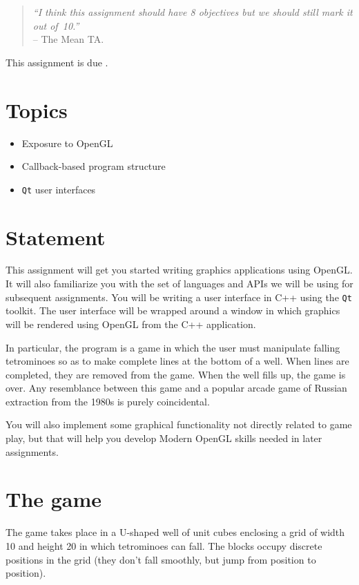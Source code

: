 \begin{quote}
        {\sl
        ``I think this assignment should have 8 objectives but we should still mark it out of~10.''
        } \\
        \mbox{}\hfill -- The Mean TA.
\end{quote}

This assignment is due {\bf \AoneDeadline}.

\section{Topics}

\begin{itemize}
	\item Exposure to OpenGL
	\item Callback-based program structure
	\item \texttt{Qt} user interfaces
\end{itemize}

\section{Statement}

This assignment will get you started writing graphics applications
using OpenGL.  It will also familiarize you with the set of languages
and APIs we will be using for subsequent assignments.  You will be
writing a user interface in C++ using the \texttt{Qt} toolkit.
The user interface will be wrapped around a window in which graphics
will be rendered using OpenGL from the C++ application.

In particular, the program is a game in which the user must manipulate
falling tetrominoes so as to make complete lines at the bottom of a
well.  When lines are completed, they are removed from the game.  When
the well fills up, the game is over.  Any resemblance between this
game and a popular arcade game of Russian extraction from the 1980s
is purely coincidental.

You will also implement some graphical functionality not directly
related to game play, but that will help you develop Modern OpenGL skills
needed in later assignments.

\section{The game}

The game takes place in a U-shaped well of unit cubes enclosing
a grid of width 10 and height 20 in which tetrominoes can fall.
The blocks occupy discrete positions in the grid (they don't fall
smoothly, but jump from position to position).

